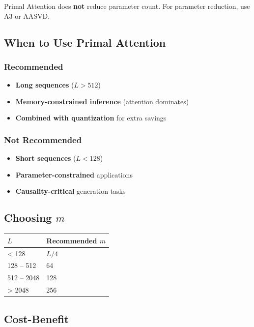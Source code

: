 Primal Attention does \textbf{not} reduce parameter count. For parameter 
reduction, use A3 or AASVD.

\subsection{When to Use Primal Attention}

\subsubsection{Recommended}

\begin{itemize}
\item \textbf{Long sequences} ($L > 512$)
\item \textbf{Memory-constrained inference} (attention dominates)
\item \textbf{Combined with quantization} for extra savings

\end{itemize}
\subsubsection{Not Recommended}

\begin{itemize}
\item \textbf{Short sequences} ($L < 128$)
\item \textbf{Parameter-constrained} applications
\item \textbf{Causality-critical} generation tasks

\end{itemize}
\subsection{Choosing $m$}

\begin{table}[H]
\centering
\small
\begin{tabular}{ll}
\toprule
\textbf{$L$} & \textbf{Recommended $m$} \\
\midrule
< 128 & $L / 4$ \\
128 -- 512 & 64 \\
512 -- 2048 & 128 \\
> 2048 & 256 \\
\bottomrule
\end{tabular}
\end{table}

\subsection{Cost-Benefit}

